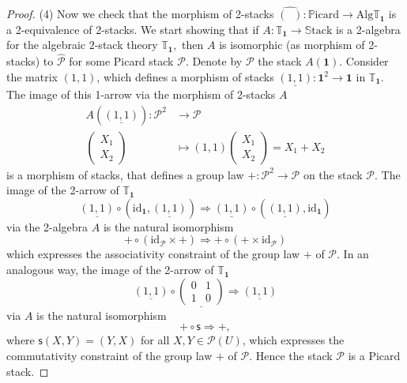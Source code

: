 \documentclass[11pt]{amsart}
\newcommand{\cP}{\mathcal{P}}
\newcommand{\PICARD}{\mathbb{P}\mathrm{icard}}
\newcommand{\STACK}{\mathbb{S}\mathrm{tack}}
\newcommand{\id}{\mathrm{id}}
\newcommand{\bfu}{\textbf{1}}
\newcommand{\twoT}{\mathbb{T}}
\newcommand{\Alg}{\mathrm{Alg}}
\theoremstyle{definition}
\numberwithin{equation}{section}
\begin{document}
\begin{proof}
(4) Now we check that the morphism of 2-stacks
$ \widehat{(\; \;)}:\PICARD \longrightarrow \Alg \twoT_{\bfu} $ is a 2-equivalence of 2-stacks. We start showing that 
if $A: \twoT_{\bfu} \to \STACK$ is a 2-algebra for the algebraic $2$-stack theory $\twoT_{\bfu},$ then $A$ is isomorphic (as morphism of 2-stacks) to $\widehat{\cP}$ for some Picard stack $\cP$.
Denote by $\cP$ the stack $A(\bfu)$. Consider the matrix $(1,1)$, which defines a morphism of stacks $\underline{(1,1)}: \bfu^2 \to \bfu$ in $\twoT_{\bfu}.$ The image 
of this 1-arrow via the morphism of 2-stacks $A$ 
\begin{align*}
	 A(\underline{(1,1)}) : \cP^2 &\longrightarrow \cP\\
	 \left( \begin{matrix}
	 	X_1\\ X_2
	 \end{matrix} \right)& \longmapsto (1,1)  \left( \begin{matrix}
 X_1\\ X_2
\end{matrix} \right) =X_1+X_2
\end{align*}
is a morphism of stacks, that defines a group law $+: \cP^2 \to \cP$ on the stack $\cP$.
The image of the 2-arrow of $\twoT_{\bfu}$
\[ \underline{(1,1)} \circ (\id_{\bfu},\underline{(1,1)}) \Rightarrow \underline{(1,1)} \circ (\underline{(1,1)},\id_{\bfu}) \]
 via the 2-algebra $A$ is the natural isomorphism 
\[ +\circ (\id_\cP \times +) \Rightarrow  +\circ (+\times \id_\cP)  \]
 which expresses the associativity constraint of the group law $+$ of $\cP$.
In an analogous way, the image of the 2-arrow of $\twoT_{\bfu}$
\[ \underline{(1,1)} \circ \underline{\left( \begin{matrix}
0&1\\1&0
\end{matrix} \right)} \Rightarrow \underline{(1,1)} \]
 via $A$ is the natural isomorphism
\[ +\circ \mathsf{s} \Rightarrow +,  \]
where $ \mathsf{s}(X,Y)=(Y,X)$ for all $X,Y \in \cP(U)$, which expresses the commutativity constraint of the group law $+$ of $\cP$.
Hence the stack $\cP$ is a Picard stack. 


\end{proof}
\end{document}
